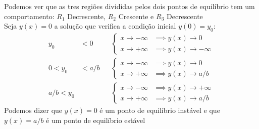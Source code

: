 \documentclass["AM3C-Slides_annotations.tex"]{subfiles}
\begin{document}
\begin{exampleBox}
\begin{center}
  \end{center}
  Podemos ver que as tres regiões divididas pelos dois pontos de equilíbrio tem um comportamento: \(R_1\) Decrescente, \(R_2\) Crescente e \(R_3\) Decrescente\\
  Seja \(y(x)=0\) a solução que verifica a condição inicial \(y(0)=y_0\):
  \begin{align*}
    y_0 &< 0
    && \begin{cases}
      x \to -\infty &\implies y(x) \to 0
      \\ x \to +\infty &\implies y(x) \to -\infty
    \end{cases}
    \\
    0 < y_0 &< a/b
    && \begin{cases}
      x \to -\infty &\implies y(x) \to 0
      \\ x \to +\infty &\implies y(x) \to a/b
    \end{cases}
    \\
    a/b < y_0 &
    && \begin{cases}
      x \to -\infty &\implies y(x) \to +\infty
      \\ x \to +\infty &\implies y(x) \to a/b
    \end{cases}
  \end{align*}
  Podemos dizer que \(y(x)=0\) é um ponto de equilíbrio instável e que \(y(x)=a/b\) é um ponto de equilíbrio estável
\end{exampleBox}
\end{document}
